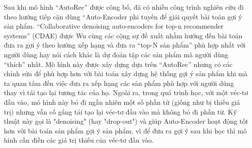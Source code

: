 
Sau khi mô hình ``AutoRec'' được công bố, đã có nhiều công trình nghiên cứu đi theo hướng tiếp cận dùng ``Auto-Encoder phi tuyến để giải quyết bài toán gợi ý sản phẩm. 
``Collaborative denoising auto-encoders for top-n recommender systems'' \cite{cdae} (CDAE) được Wu cùng các cộng sự đề xuất nhằm hướng đến bài toán đưa ra gợi ý theo hướng xếp hạng và đưa ra ``top-N sản phẩm'' phù hợp nhất với người dùng hay nói cách khác là dự đoán tập các sản phẩm mà người dùng ``thích'' nhất. 
Mô hình này được xây dựng dựa trên ``AutoRec'' nhưng có các chỉnh sửa để phù hợp hơn với bài toán xây dựng hệ thống gợi ý sản phẩm khi mà ta quan tâm đến việc đưa ra xếp hạng các sản phẩm phù hợp với người dùng thay vì tái tạo lại tương tác của họ. 
Ngoài ra, trong quá trình học, với một véc-tơ đầu vào, mô hình này bỏ đi ngẫu nhiên một số phần tử (giống như bị thiếu giá trị) nhưng vẫn cố gắng tái tạo lại véc-tơ đầu vào mà không bỏ đi phần tử. 
Kỹ thuật này gọi là "denoising" (hay "drop-out") và giúp Auto-Encoder hoạt động tốt hơn với bài toán sản phẩm gợi ý sản phẩm, vì để đưa ra gợi ý sau khi học thì mô hình cần điền các giá trị thiếu của véc-tơ đầu vào.

